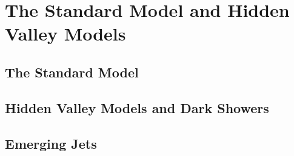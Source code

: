 \chapter{The Standard Model and Hidden Valley Models}

\section{The Standard Model}

\section{Hidden Valley Models and Dark Showers}

\section{Emerging Jets}
